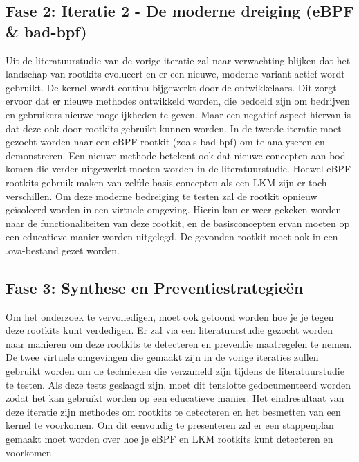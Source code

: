 \subsection {Fase 2: Iteratie 2 - De moderne dreiging (eBPF & bad-bpf)}
Uit de literatuurstudie van de vorige iteratie zal naar verwachting blijken dat het landschap van rootkits evolueert en er een nieuwe, moderne variant actief wordt gebruikt. De kernel wordt continu bijgewerkt door de ontwikkelaars. Dit zorgt ervoor dat er nieuwe methodes ontwikkeld worden, die bedoeld zijn om bedrijven en gebruikers nieuwe mogelijkheden te geven. Maar een negatief aspect hiervan is dat deze ook door rootkits gebruikt kunnen worden. In de tweede iteratie moet gezocht worden naar een eBPF rootkit (zoals bad-bpf) om te analyseren en demonstreren. Een nieuwe methode betekent ook dat nieuwe concepten aan bod komen die verder uitgewerkt moeten worden in de literatuurstudie. Hoewel eBPF-rootkits gebruik maken van zelfde basis concepten als een LKM zijn er toch verschillen. Om deze moderne bedreiging te testen zal de rootkit opnieuw geïsoleerd worden in een virtuele omgeving. Hierin kan er weer gekeken worden naar de functionaliteiten van deze rootkit, en de basisconcepten ervan moeten op een educatieve manier worden uitgelegd. De gevonden rootkit moet ook in een .ova-bestand gezet worden. 

\subsection {Fase 3: Synthese en Preventiestrategieën}
Om het onderzoek te vervolledigen, moet ook getoond worden hoe je je tegen deze rootkits kunt verdedigen. Er zal via een literatuurstudie gezocht worden naar manieren om deze rootkits te detecteren en preventie maatregelen te nemen. De twee virtuele omgevingen die gemaakt zijn in de vorige iteraties zullen gebruikt worden om de technieken die verzameld zijn tijdens de literatuurstudie te testen. Als deze tests geslaagd zijn, moet dit tenslotte gedocumenteerd worden zodat het kan gebruikt worden op een educatieve manier. Het eindresultaat van deze iteratie zijn methodes om rootkits te detecteren en het besmetten van een kernel te voorkomen. Om dit eenvoudig te presenteren zal er een stappenplan gemaakt moet worden over hoe je eBPF en LKM rootkits kunt detecteren en voorkomen.